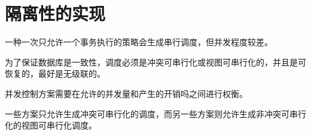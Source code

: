 \section{隔离性的实现}

一种一次只允许一个事务执行的策略会生成串行调度，但并发程度较差。

为了保证数据库是一致性，调度必须是冲突可串行化或视图可串行化的，并且是可恢复的，最好是无级联的。

并发控制方案需要在允许的并发量和产生的开销吗之间进行权衡。

一些方案只允许生成冲突可串行化的调度，而另一些方案则允许生成非冲突可串行化的视图可串行化调度。